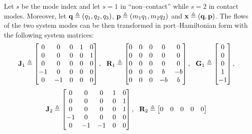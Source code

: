 \begin{exmp}
    Let $s$ be the mode index and let $s=1$ in ``non--contact'' while $s=2$ in contact modes. Moreover, let $\mathbf{q} \triangleq (q_1,q_2,q_3)$, $\mathbf{p}\triangleq (m_1q_1,m_2q_2)$ and $\mathbf{x}\triangleq(\mathbf{q},\mathbf{p})$. The flows of the two system modes can be then transformed in port--Hamiltonian form with the following system matrices:
    \begin{equation}
        \mathbf{J}_1\triangleq
        \begin{bmatrix}
            0&0&0&1&0\\
            0&0&0&0&1\\
            0&0&0&0&0\\
            -1&0&0&0&0\\
            0&-1&0&0&0\\
        \end{bmatrix},~~
        \mathbf{R}_1\triangleq
        \begin{bmatrix}
            0&0&0&0&0\\
            0&0&0&0&0\\
            0&0&0&0&0\\
            0&0&0&b&-b\\
            0&0&0&-b&b\\
        \end{bmatrix},~~
        \mathbf{G}_1\triangleq
        \begin{bmatrix}
            0\\0\\0\\1\\-1
        \end{bmatrix},
    \end{equation}
    \begin{equation}
        \mathbf{J}_2\triangleq
        \begin{bmatrix}
            0&0&0&1&0\\
            0&0&0&0&1\\
            0&0&0&0&1\\
            -1&0&0&0&0\\
            0&-1&-1&0&0\\
        \end{bmatrix},~~
        \mathbf{R}_2\triangleq
        \begin{bmatrix}
            0&0&0&0&0\\

\end{bmatrix}
\end{equation}
\end{exmp}
